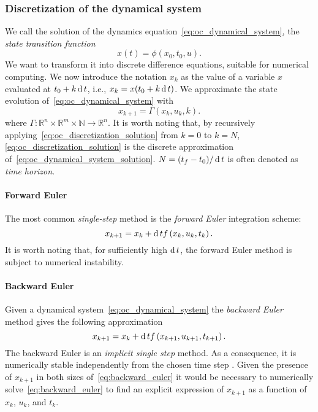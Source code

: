 \subsubsection{Discretization of the dynamical system}
We call the solution of the dynamics equation~\eqref{eq:oc_dynamical_system}, the \emph{state transition function} 
\begin{equation}
    \label{eq:oc_dynamical_system_solution}
    x(t) = \phi(x_0, t_0, u).
\end{equation}
We want to transform it into discrete difference equations, suitable for numerical computing.  We now introduce the notation $x_k$ as the value of a variable $x$ evaluated at $t_0 + k \operatorname{d} t$, i.e., $x_k = x(t_0 + k \operatorname{d} t)$. We approximate the state evolution of~\eqref{eq:oc_dynamical_system} with
\begin{equation}
\label{eq:oc_discretization_solution}
x_{k+1} = \Gamma \left(x_k, u_k, k\right).
\end{equation}
where $\Gamma: \mathbb{R}^{n} \times \mathbb{R}^m \times \mathbb{N}  \rightarrow \mathbb{R}^{n}$. It is worth noting that, by recursively applying~\eqref{eq:oc_discretization_solution} from $k = 0$ to $k = N$, \eqref{eq:oc_discretization_solution} is the discrete approximation of~\eqref{eq:oc_dynamical_system_solution}.  $N = (t_f - t_0) / \operatorname{d} t$ is often denoted as \emph{time horizon}.
\paragraph{Forward Euler}
The most common \emph{single-step} method is the \emph{forward Euler} integration scheme:
\begin{equation}
    \label{eq:forward_euler}
	x_{k+1} = x_k  + \operatorname{d} t f\left(x_k, u_k, t_k\right).
\end{equation}
It is worth noting that, for sufficiently high $\operatorname{d} t$, the forward Euler method is subject to numerical instability.

\paragraph{Backward Euler} 
Given a dynamical system~\eqref{eq:oc_dynamical_system} the \emph{backward Euler} method gives the following approximation 
\begin{equation} 
    \label{eq:backward_euler}
	x_{k+1} = x_k  + \operatorname{d} t f\left(x_{k+1}, u_{k+1}, t_{k+1}\right).
\end{equation}
The backward Euler is an \emph{implicit single step} method. As a consequence, it is numerically stable independently from the chosen time step \citep{Ascher1997Implicit-explicitEquations}. 
Given the presence of $x_{k+1}$ in both sizes of~\eqref{eq:backward_euler} it would be necessary to numerically solve~\eqref{eq:backward_euler} to find an explicit expression of $x_{k+1}$ as a function of $x_{k}$, $u_{k}$, and $t_{k}$.

